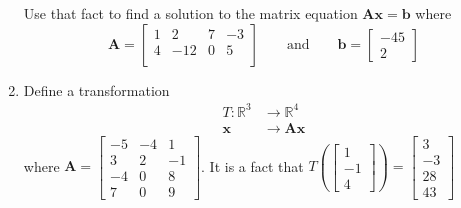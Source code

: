 \documentclass[basic]{inVerba-notes}
\begin{document}
\begin{enumerate}[align=left, leftmargin=0pt, labelindent=\parindent, listparindent=\parindent, labelwidth=0pt, itemindent=!]
  Use that fact to find a solution to the matrix equation \(\bm{Ax} = \bm{b }\) where 
  \[%
  \bm{A} = \begin{bmatrix}
  1 & 2 & 7 & -3 \\
  4 & -12 & 0 & 5 \\
  \end{bmatrix}
  \qquad \text{and} \qquad
  \bm{b} = \begin{bmatrix} -45 \\  2 \end{bmatrix}
  \]%
  
  
  \item {} Define a transformation 
  \begin{align*}
    T: \mathbb{R}^3 &\to \mathbb{R}^4 \\
    \bm{x} &\to \bm{Ax}
  \end{align*}
  where \(\bm{A} = \begin{bmatrix}
  -5 & -4 & 1 \\
  3 & 2 & -1 \\
  -4 & 0 & 8 \\
  7 & 0 & 9
  \end{bmatrix}\). 
  It is a fact that 
  \(%
  T\left(\begin{bmatrix} 1 \\ -1 \\ 4 \end{bmatrix}\right) = \begin{bmatrix} 3 \\ -3 \\ 28 \\ 43 \end{bmatrix}
  \)%
  

\end{enumerate}
\end{document}
